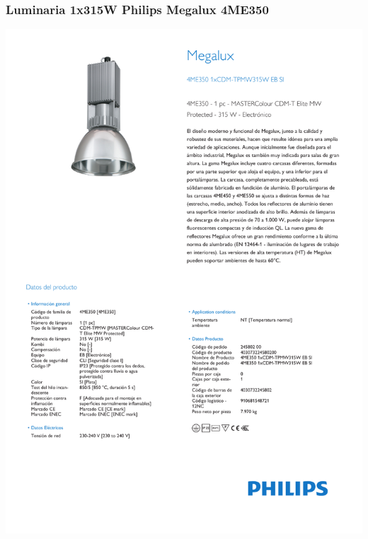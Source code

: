 \subsubsection{Luminaria 1x315W Philips Megalux 4ME350}
\hspace*{-2cm}
\includegraphics[page=1]{Datasheets/ph3.pdf}
\newpage
